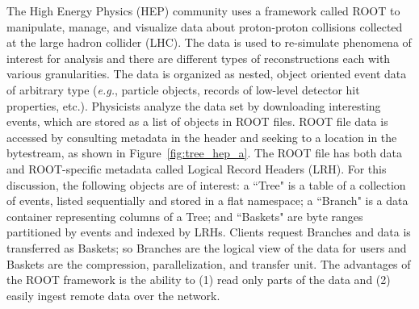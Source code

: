 The High Energy Physics (HEP) community uses a framework called ROOT to
manipulate, manage, and visualize data about proton-proton collisions collected
at the large hadron collider (LHC). The data is used to re-simulate phenomena
of interest for analysis and there are different types of reconstructions each
with various granularities. The data is organized as nested, object oriented
event data of arbitrary type ({\it e.g.}, particle objects, records of
low-level detector hit properties, etc.).  Physicists analyze the data set by
downloading interesting events, which are stored as a list of objects in ROOT
files.  ROOT file data is accessed by consulting metadata in the header and
seeking to a location in the bytestream, as shown in
Figure~\ref{fig:tree_hep_a}.  The ROOT file has both data and ROOT-specific
metadata called Logical Record Headers (LRH).  For this discussion, the
following objects are of interest: a ``Tree" is a table of a collection of
events, listed sequentially and stored in a flat namespace; a ``Branch" is a
data container representing columns of a Tree; and ``Baskets" are byte ranges
partitioned by events and indexed by LRHs.  Clients request Branches and data
is transferred as Baskets; so Branches are the logical view of the data for
users and Baskets are the compression, parallelization, and transfer unit.  The
advantages of the ROOT framework is the ability to (1) read only parts of the
data and (2) easily ingest remote data over the network.  



